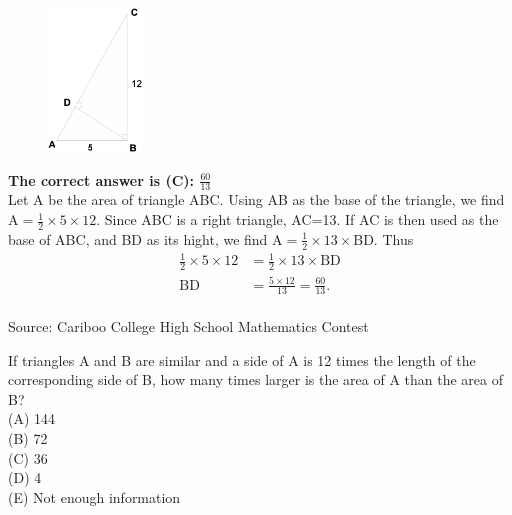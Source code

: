 \documentclass{article}
\begin{document}
\begin{figure}
	\includegraphics[width=25mm,viewport=100 67 508 675]{CCSPR73-6pic.eps}
\end{figure}
\textbf{The correct answer is (C): $\frac{60}{13}$}\\
Let A be the area of triangle ABC. Using AB as the base of the triangle, we find A$=\frac{1}{2}\times5\times12$. Since ABC is a right triangle, AC=13. If AC is then used as the base of ABC, and BD as its hight, we find A$=\frac{1}{2}\times13\times$BD. Thus
\begin{align*}
\frac{1}{2}\times5\times12&=\frac{1}{2}\times13\times\textrm{BD}\\
\textrm{BD}&=\frac{5\times12}{13}=\frac{60}{13}.
\end{align*}
\\[5 ex]

\scriptsize
Source: Cariboo College High School Mathematics Contest

\normalsize
If triangles A and B are similar and a side of A is 12 times the length of the corresponding side of B, how many times larger is the area of A than the area of B?\\
(A) 144\\
(B) 72\\
(C) 36\\
(D) 4\\
(E) Not enough information\\

\end{document}
